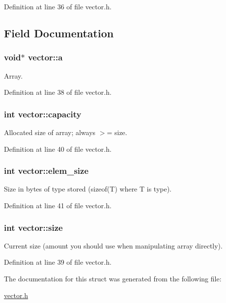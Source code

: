 Definition at line 36 of file vector.h.



\subsection{Field Documentation}
\hypertarget{structvector_ab7be2d9a85f6fa18178475cf04f04024}{
\subsubsection[{a}]{\setlength{\rightskip}{0pt plus 5cm}void$\ast$ {\bf vector::a}}}
\label{structvector_ab7be2d9a85f6fa18178475cf04f04024}


Array. 



Definition at line 38 of file vector.h.

\hypertarget{structvector_a95bc684a8044cfc0e509861448908bf2}{
\subsubsection[{capacity}]{\setlength{\rightskip}{0pt plus 5cm}int {\bf vector::capacity}}}
\label{structvector_a95bc684a8044cfc0e509861448908bf2}


Allocated size of array; always $>$= size. 



Definition at line 40 of file vector.h.

\hypertarget{structvector_a1e2d06aaea690d5420fc153fa9b8c2b8}{
\subsubsection[{elem\_\-size}]{\setlength{\rightskip}{0pt plus 5cm}int {\bf vector::elem\_\-size}}}
\label{structvector_a1e2d06aaea690d5420fc153fa9b8c2b8}


Size in bytes of type stored (sizeof(T) where T is type). 



Definition at line 41 of file vector.h.

\hypertarget{structvector_a211c6f9096b87e1ff8b09ad5ad373e61}{
\subsubsection[{size}]{\setlength{\rightskip}{0pt plus 5cm}int {\bf vector::size}}}
\label{structvector_a211c6f9096b87e1ff8b09ad5ad373e61}


Current size (amount you should use when manipulating array directly). 



Definition at line 39 of file vector.h.



The documentation for this struct was generated from the following file:\begin{DoxyCompactItemize}
\item 
\hyperlink{vector_8h}{vector.h}\end{DoxyCompactItemize}

